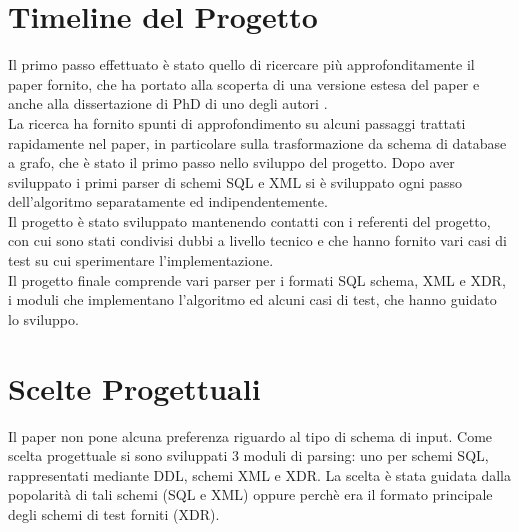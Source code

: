 \documentclass[a4paper,10pt]{article}
\begin{document}

\section{Timeline del Progetto}

Il primo passo effettuato è stato quello di ricercare più approfonditamente il paper fornito, che ha portato alla scoperta di una versione estesa del paper \cite{sfpaper_ext} e anche alla dissertazione di PhD di uno degli autori \cite{generic_model_man}.\\

La ricerca ha fornito spunti di approfondimento su alcuni passaggi trattati rapidamente nel paper, in particolare sulla trasformazione da schema di database a grafo, che è stato il primo passo nello sviluppo del progetto.
Dopo aver sviluppato i primi parser di schemi SQL e XML si è sviluppato ogni passo dell’algoritmo separatamente ed indipendentemente.\\

Il progetto è stato sviluppato mantenendo contatti con i referenti del progetto, con cui sono stati condivisi dubbi a livello tecnico e che hanno fornito vari casi di test su cui sperimentare l’implementazione.\\

Il progetto finale comprende vari parser per i formati SQL schema, XML e XDR, i moduli che implementano l’algoritmo ed alcuni casi di test, che hanno guidato lo sviluppo.\\


\section{Scelte Progettuali}
\label{Scelte Progettuali}

Il paper non pone alcuna preferenza riguardo al tipo di schema di input. Come scelta progettuale si sono sviluppati 3 moduli di parsing: uno per schemi SQL, rappresentati mediante DDL, schemi XML e XDR. La scelta è stata guidata dalla popolarità di tali schemi (SQL e XML) oppure perchè era il formato principale degli schemi di test forniti (XDR).\\
\end{document}
